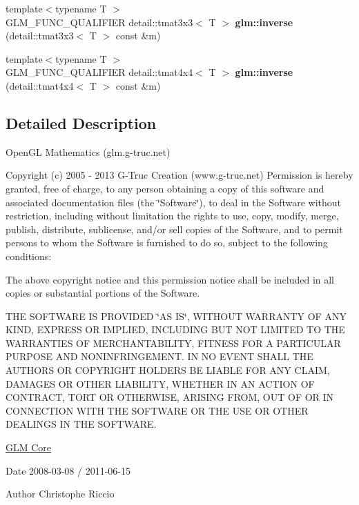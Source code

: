 \begin{DoxyCompactItemize}
\item 
\hypertarget{namespaceglm_aa36ca53440c855c7ff7671ab45768974}{}{\footnotesize template$<$typename T $>$ }\\G\+L\+M\+\_\+\+F\+U\+N\+C\+\_\+\+Q\+U\+A\+L\+I\+F\+I\+E\+R detail\+::tmat3x3$<$ T $>$ {\bfseries glm\+::inverse} (detail\+::tmat3x3$<$ T $>$ const \&m)\label{namespaceglm_aa36ca53440c855c7ff7671ab45768974}

\item 
\hypertarget{namespaceglm_ac56acd990d10a871d52d3cf08b2e145f}{}{\footnotesize template$<$typename T $>$ }\\G\+L\+M\+\_\+\+F\+U\+N\+C\+\_\+\+Q\+U\+A\+L\+I\+F\+I\+E\+R detail\+::tmat4x4$<$ T $>$ {\bfseries glm\+::inverse} (detail\+::tmat4x4$<$ T $>$ const \&m)\label{namespaceglm_ac56acd990d10a871d52d3cf08b2e145f}

\end{DoxyCompactItemize}


\subsection{Detailed Description}
Open\+G\+L Mathematics (glm.\+g-\/truc.\+net)

Copyright (c) 2005 -\/ 2013 G-\/\+Truc Creation (www.\+g-\/truc.\+net) Permission is hereby granted, free of charge, to any person obtaining a copy of this software and associated documentation files (the \char`\"{}\+Software\char`\"{}), to deal in the Software without restriction, including without limitation the rights to use, copy, modify, merge, publish, distribute, sublicense, and/or sell copies of the Software, and to permit persons to whom the Software is furnished to do so, subject to the following conditions\+:

The above copyright notice and this permission notice shall be included in all copies or substantial portions of the Software.

T\+H\+E S\+O\+F\+T\+W\+A\+R\+E I\+S P\+R\+O\+V\+I\+D\+E\+D \char`\"{}\+A\+S I\+S\char`\"{}, W\+I\+T\+H\+O\+U\+T W\+A\+R\+R\+A\+N\+T\+Y O\+F A\+N\+Y K\+I\+N\+D, E\+X\+P\+R\+E\+S\+S O\+R I\+M\+P\+L\+I\+E\+D, I\+N\+C\+L\+U\+D\+I\+N\+G B\+U\+T N\+O\+T L\+I\+M\+I\+T\+E\+D T\+O T\+H\+E W\+A\+R\+R\+A\+N\+T\+I\+E\+S O\+F M\+E\+R\+C\+H\+A\+N\+T\+A\+B\+I\+L\+I\+T\+Y, F\+I\+T\+N\+E\+S\+S F\+O\+R A P\+A\+R\+T\+I\+C\+U\+L\+A\+R P\+U\+R\+P\+O\+S\+E A\+N\+D N\+O\+N\+I\+N\+F\+R\+I\+N\+G\+E\+M\+E\+N\+T. I\+N N\+O E\+V\+E\+N\+T S\+H\+A\+L\+L T\+H\+E A\+U\+T\+H\+O\+R\+S O\+R C\+O\+P\+Y\+R\+I\+G\+H\+T H\+O\+L\+D\+E\+R\+S B\+E L\+I\+A\+B\+L\+E F\+O\+R A\+N\+Y C\+L\+A\+I\+M, D\+A\+M\+A\+G\+E\+S O\+R O\+T\+H\+E\+R L\+I\+A\+B\+I\+L\+I\+T\+Y, W\+H\+E\+T\+H\+E\+R I\+N A\+N A\+C\+T\+I\+O\+N O\+F C\+O\+N\+T\+R\+A\+C\+T, T\+O\+R\+T O\+R O\+T\+H\+E\+R\+W\+I\+S\+E, A\+R\+I\+S\+I\+N\+G F\+R\+O\+M, O\+U\+T O\+F O\+R I\+N C\+O\+N\+N\+E\+C\+T\+I\+O\+N W\+I\+T\+H T\+H\+E S\+O\+F\+T\+W\+A\+R\+E O\+R T\+H\+E U\+S\+E O\+R O\+T\+H\+E\+R D\+E\+A\+L\+I\+N\+G\+S I\+N T\+H\+E S\+O\+F\+T\+W\+A\+R\+E.

\hyperlink{group__core}{G\+L\+M Core}

\begin{DoxyDate}{Date}
2008-\/03-\/08 / 2011-\/06-\/15 
\end{DoxyDate}
\begin{DoxyAuthor}{Author}
Christophe Riccio 
\end{DoxyAuthor}
